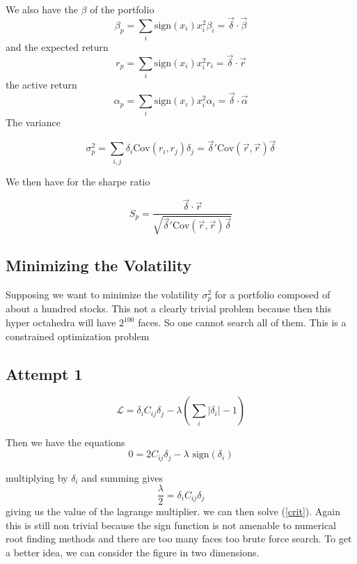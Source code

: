 \documentclass[10pt,letterpaper,oneside]{article}
\begin{document}
We also have the $\beta$ of the portfolio
\begin{equation}
\beta_{p}=\sum_{i}\text{sign}{(x_i)}x_i^2 \beta_i=\vec{\delta}\cdot \vec{\beta}
\end{equation}
and the expected  return
\begin{equation}
r_{p}=\sum_{i}\text{sign}{(x_i)}x_i^2 r_i=\vec{\delta}\cdot \vec{r}
\end{equation}
the active return
\begin{equation}
\alpha_{p}=\sum_{i}\text{sign}{(x_i)}x_i^2 \alpha_i=\vec{\delta}\cdot \vec{\alpha}
\end{equation}
The variance

\begin{equation}
\sigma_{p}^2=\sum_{i,j}\delta_i \text{Cov}(r_i,r_j)\delta_j=\vec{\delta}' \text{Cov}(\vec{r},\vec{r})\vec{\delta}
\end{equation}


We then have for the sharpe ratio

\begin{equation}
S_p=\frac{\vec{\delta}\cdot \vec{r}}{\sqrt{\vec{\delta}' \text{Cov}(\vec{r},\vec{r})\vec{\delta}}}
\end{equation}

\subsection{Minimizing the Volatility}
Supposing we want to minimize the volatility $\sigma_p^2$ for a portfolio composed of about a hundred stocks. This not a clearly trivial problem because then this hyper octahedra will have $2^{100}$ faces. So one cannot search all of them. This is a constrained optimization problem

\subsection{Attempt 1}
\begin{equation}
\mathcal{L}=\delta_i C_{i j} \delta_j-\lambda \left(\sum_{i}|\delta_i|-1\right)
\end{equation}

Then we have the equations
\begin{equation}\label{crit}
0=2 C_{i j}\delta_j-\lambda \,\,\text{sign}(\delta_i)
\end{equation}

multiplying by $\delta_i$ and summing gives
\begin{equation}
\frac{\lambda}{2}=\delta_i C_{i j} \delta_j
\end{equation}
giving us the value of the lagrange multiplier. we can then solve (\ref{crit}). Again this is still non trivial because the sign function is not amenable to numerical root finding methods and there are too many faces too brute force search. To get a better idea, we can consider the figure in two dimensions.
\end{document}
